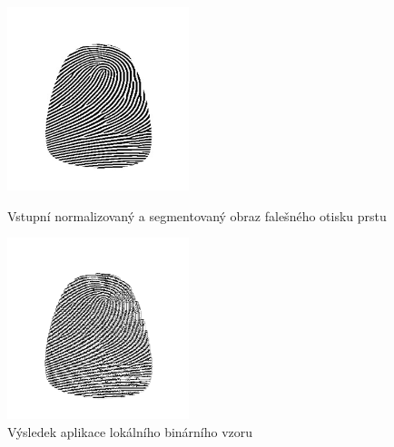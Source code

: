 \begin{figure}[htbp]
  \begin{minipage}[b]{0.5\linewidth}
    \centering
    \includegraphics[width=200]{obrazky-figures/SG_LLnorm.png}
    \caption{Vstupní normalizovaný a segmentovaný obraz falešného otisku prstu}
    \label{fig:origimgSGLL}
  \end{minipage}
  \hspace{0.5cm}
  \begin{minipage}[b]{0.5\linewidth}
    \centering
    \includegraphics[width=200]{obrazky-figures/SDLBP.png}
    \caption{Výsledek aplikace lokálního binárního vzoru}
    \label{fig:lbpfake}
  \end{minipage}
\end{figure}


